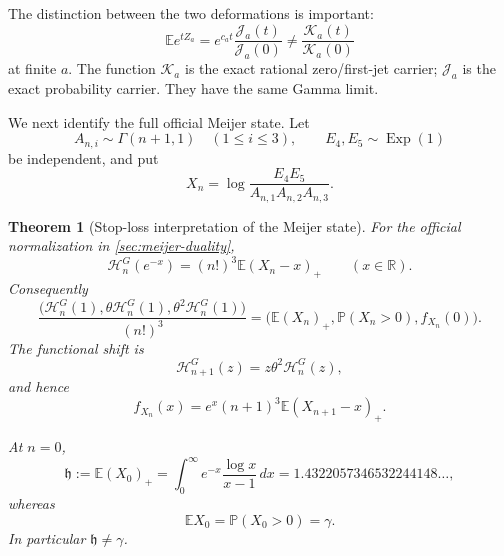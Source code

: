 \documentclass[11pt]{article}
\theoremstyle{keio}
\newtheorem{theorem}{Theorem}[section]
\theoremstyle{definition}
\theoremstyle{remark}
\newcommand{\R}{\mathbb R}
\newcommand{\Prob}{\mathbb P}
\begin{document}
The distinction between the two deformations is important:
\begin{equation}\label{eq:mgf-not-K}
 \mathbb Ee^{tZ_a}
 =e^{c_at}\frac{\mathscr J_a(t)}{\mathscr J_a(0)}
 \ne\frac{\mathscr K_a(t)}{\mathscr K_a(0)}
\end{equation}
at finite \(a\).  The function \(\mathscr K_a\) is the exact rational
zero/first-jet carrier; \(\mathscr J_a\) is the exact probability carrier.
They have the same Gamma limit.

We next identify the full official Meijer state.  Let
\begin{equation}\label{eq:Xn-def}
 A_{n,i}\sim\Gamma(n+1,1)\quad(1\le i\le3),\qquad
 E_4,E_5\sim\operatorname{Exp}(1)
\end{equation}
be independent, and put
\begin{equation}\label{eq:Xn-ratio}
 X_n=\log\frac{E_4E_5}{A_{n,1}A_{n,2}A_{n,3}}.
\end{equation}

\begin{theorem}[Stop-loss interpretation of the Meijer state]
\label{thm:meijer-probability}
For the official normalization in \cref{sec:meijer-duality},
\begin{equation}\label{eq:Meijer-stop-loss}
 \boxed{\displaystyle
 \mathcal H_n^G(e^{-x})=(n!)^3\mathbb E(X_n-x)_+}
 \qquad(x\in\R).
\end{equation}
Consequently
\begin{equation}\label{eq:Meijer-state-probability}
 \boxed{\displaystyle
 \frac{\bigl(\mathcal H_n^G(1),\theta\mathcal H_n^G(1),
 \theta^2\mathcal H_n^G(1)\bigr)}{(n!)^3}
 =\bigl(\mathbb E(X_n)_+,\Prob(X_n>0),f_{X_n}(0)\bigr).}
\end{equation}
The functional shift is
\begin{equation}\label{eq:Meijer-functional-shift}
 \mathcal H_{n+1}^G(z)=z\theta^2\mathcal H_n^G(z),
\end{equation}
and hence
\begin{equation}\label{eq:probability-conservation}
 f_{X_n}(x)=e^x(n+1)^3\mathbb E(X_{n+1}-x)_+.
\end{equation}

At \(n=0\),
\begin{equation}\label{eq:h-constant}
 \mathfrak h:=\mathbb E(X_0)_+
 =\int_0^\infty e^{-x}\frac{\log x}{x-1}\,dx
 =1.4322057346532244148\ldots,
\end{equation}
whereas
\begin{equation}\label{eq:Powers-gamma}
 \mathbb EX_0=\Prob(X_0>0)=\gamma.
\end{equation}
In particular \(\mathfrak h\ne\gamma\).
\end{theorem}
\end{document}
